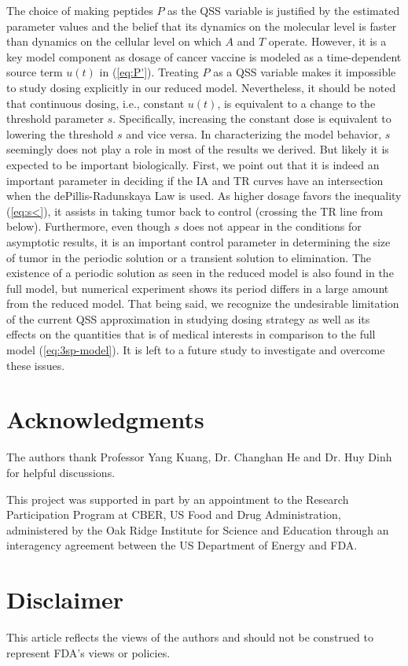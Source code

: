 \documentclass[review,authoryear]{elsarticle}
\begin{document}
The choice of making peptides $P$ as the QSS variable is justified
by the estimated parameter values and the belief that its dynamics on the molecular
level is faster than dynamics on the cellular level on which $A$
and $T$ operate. However, it is a key model component as dosage of cancer
vaccine is modeled as a time-dependent source term $u(t)$ in (\ref{eq:P'}).
Treating $P$ as a QSS variable makes it impossible to study dosing
explicitly in our reduced model. Nevertheless, it should be noted
that continuous dosing, i.e., constant $u(t)$, is equivalent to a
change to the threshold parameter $s$. Specifically, increasing the
constant dose is equivalent to lowering the threshold $s$ and vice versa. In characterizing the model behavior, $s$ seemingly does not
play a role in most of the results we derived. But likely it is expected
to be important biologically. First, we point out that it is indeed
an important parameter in deciding if the IA and TR curves have an
intersection when the dePillis-Radunskaya Law is used. As higher
dosage favors the inequality (\ref{eq:s<}), it assists in taking
tumor back to control (crossing the TR line from below). Furthermore,
even though $s$ does not appear in the conditions for asymptotic
results, it is an important control parameter in determining the size
of tumor in the periodic solution or a transient solution to elimination.
The existence of a periodic solution as seen in the reduced model
is also found in the full model, but numerical experiment shows its
period differs in a large amount from the reduced model. That being
said, we recognize the undesirable limitation of the current QSS
approximation in studying dosing strategy as well as its effects on
the quantities that is of medical interests in comparison to the full
model (\ref{eq:3sp-model}). It is left to a future study to investigate and
overcome these issues. 

\section*{Acknowledgments}
The authors thank Professor Yang Kuang, Dr. Changhan He and Dr. Huy Dinh for helpful discussions.

This project was supported in part by an appointment to
the Research Participation Program at CBER, US Food and
Drug Administration, administered by the Oak Ridge Institute for Science and Education through an interagency agreement between the US Department of Energy and FDA.

\section*{Disclaimer}
This article reflects the views of the authors and should not be construed to represent FDA’s
views or policies. 
\end{document}
